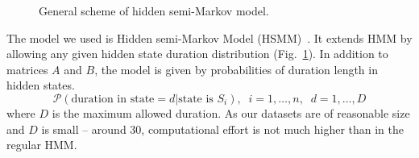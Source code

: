 \documentclass[10pt,letterpaper]{article}
\begin{document}
\begin{figure}[h]
% 
% 
% 
% 
% 
% 
\caption{General scheme of hidden semi-Markov model.}
\label{fig:hsmm}
\end{figure}


The model we used is Hidden semi-Markov Model (HSMM)~\cite{Yu2010215}. It extends HMM by allowing any given hidden state duration distribution (Fig.~\ref{fig:hsmm}).
In addition to matrices $A$ and $B$, the model is given by probabilities of duration length in hidden states.
$$\mathcal{P}(\text{duration in state} = d | \text{state is } S_i), \;\; i = 1, \dots, n, \;\; d = 1, \dots, D$$
where $D$ is the maximum allowed duration.
As our datasets are of reasonable size and $D$ is small -- around 30, computational effort is not much 
higher than in the regular HMM. 
\end{document}
